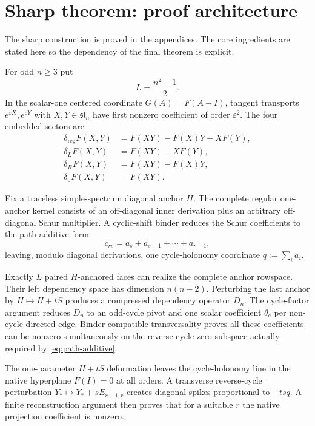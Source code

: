 \documentclass[11pt]{article}
\theoremstyle{definition}
\theoremstyle{remark}
\begin{document}
\section{Sharp theorem: proof architecture}
The sharp construction is proved in the appendices. The core ingredients are stated here so the dependency of the final theorem is explicit.

For odd $n\ge3$ put
\begin{equation}\label{eq:Lodd}
L=\frac{n^2-1}{2}.
\end{equation}
In the scalar-one centered coordinate $G(A)=F(A-I)$, tangent transports $e^{\varepsilon X},e^{\varepsilon Y}$ with $X,Y\in\mathfrak{sl}_n$ have first nonzero coefficient of order $\varepsilon^2$. The four embedded sectors are
\begin{align}
\delta_{\mathrm{reg}}F(X,Y)&=F(XY)-F(X)Y-XF(Y),\label{eq:centered-reg}\\
\delta_LF(X,Y)&=F(XY)-XF(Y),\label{eq:centered-left}\\
\delta_RF(X,Y)&=F(XY)-F(X)Y,\label{eq:centered-right}\\
\delta_0F(X,Y)&=F(XY).\label{eq:centered-scalar}
\end{align}

Fix a traceless simple-spectrum diagonal anchor $H$. The complete regular one-anchor kernel consists of an off-diagonal inner derivation plus an arbitrary off-diagonal Schur multiplier. A cyclic-shift binder reduces the Schur coefficients to the path-additive form
\begin{equation}\label{eq:path-additive}
c_{rs}=a_s+a_{s+1}+\cdots+a_{r-1},
\end{equation}
leaving, modulo diagonal derivations, one cycle-holonomy coordinate $q:=\sum_i a_i$.

Exactly $L$ paired $H$-anchored faces can realize the complete anchor rowspace. Their left dependency space has dimension $n(n-2)$. Perturbing the last anchor by $H\mapsto H+tS$ produces a compressed dependency operator $D_n$. The cycle-factor argument reduces $D_n$ to an odd-cycle pivot and one scalar coefficient $\theta_e$ per non-cycle directed edge. Binder-compatible transversality proves all these coefficients can be nonzero simultaneously on the reverse-cycle-zero subspace actually required by \eqref{eq:path-additive}.

The one-parameter $H+tS$ deformation leaves the cycle-holonomy line in the native hyperplane $F(I)=0$ at all orders. A transverse reverse-cycle perturbation $Y_*\mapsto Y_*+sE_{r-1,r}$ creates diagonal spikes proportional to $-tsq$. A finite reconstruction argument then proves that for a suitable $r$ the native projection coefficient is nonzero.
\end{document}
